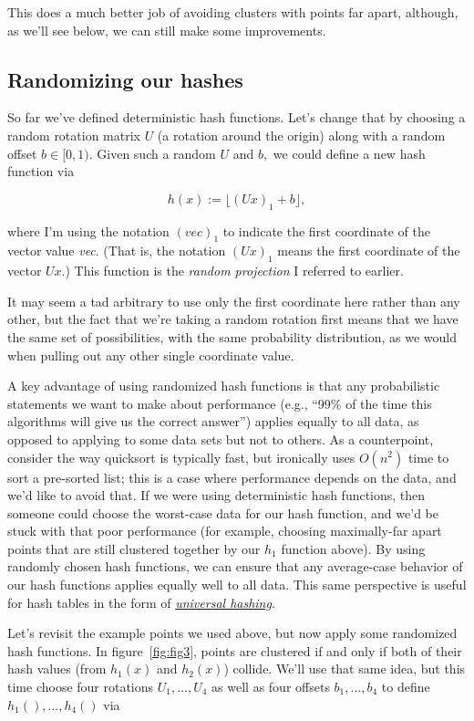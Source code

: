 \documentclass[20pt,]{extarticle}
\begin{document}
This does a much better job of avoiding clusters with points far apart,
although, as we'll see below, we can still make some improvements.

\subsection{Randomizing our hashes}\label{randomizing-our-hashes}

So far we've defined deterministic hash functions. Let's change that by
choosing a random rotation matrix \(U\) (a rotation around the origin)
along with a random offset \(b \in [0, 1).\) Given such a random \(U\)
and \(b,\) we could define a new hash function via

\[ h(x) := \lfloor (Ux)_1 + b \rfloor, \]

where I'm using the notation \(( \textit{vec} )_1\) to indicate the
first coordinate of the vector value \emph{vec}. (That is, the notation
\((Ux)_1\) means the first coordinate of the vector \(Ux\).) This
function is the \emph{random projection} I referred to earlier.

It may seem a tad arbitrary to use only the first coordinate here rather
than any other, but the fact that we're taking a random rotation first
means that we have the same set of possibilities, with the same
probability distribution, as we would when pulling out any other single
coordinate value.

A key advantage of using randomized hash functions is that any
probabilistic statements we want to make about performance (e.g., ``99\%
of the time this algorithms will give us the correct answer'') applies
equally to all data, as opposed to applying to some data sets but not to
others. As a counterpoint, consider the way quicksort is typically fast,
but ironically uses \(O(n^2)\) time to sort a pre-sorted list; this is a
case where performance depends on the data, and we'd like to avoid that.
If we were using deterministic hash functions, then someone could choose
the worst-case data for our hash function, and we'd be stuck with that
poor performance (for example, choosing maximally-far apart points that
are still clustered together by our \(h_1\) function above). By using
randomly chosen hash functions, we can ensure that any average-case
behavior of our hash functions applies equally well to all data. This
same perspective is useful for hash tables in the form of
\href{https://en.wikipedia.org/wiki/Universal_hashing}{\emph{universal
hashing}}.

Let's revisit the example points we used above, but now apply some
randomized hash functions. In figure~\ref{fig:fig3}, points are
clustered if and only if both of their hash values (from \(h_1(x)\) and
\(h_2(x)\)) collide. We'll use that same idea, but this time choose four
rotations \(U_1, \ldots, U_4\) as well as four offsets
\(b_1, \ldots, b_4\) to define \(h_1(), \ldots, h_4()\) via
\end{document}
